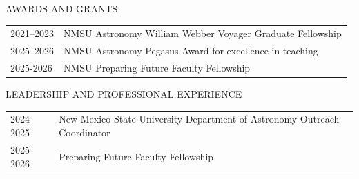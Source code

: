 
\begin{center}
AWARDS AND GRANTS
\end{center}
 
\begin{flushleft}
\begin{tabular}{ll}

2021--2023 & NMSU Astronomy William Webber Voyager Graduate Fellowship \\
2025--2026 & NMSU Astronomy Pegasus Award for excellence in teaching \\
2025-2026 & NMSU Preparing Future Faculty Fellowship 
\end{tabular}
\end{flushleft}

\medskip

\doublespacing


\begin{center}
LEADERSHIP AND PROFESSIONAL EXPERIENCE
\end{center}
\begin{flushleft}
\begin{tabular}{ll}
2024-2025 & New Mexico State University Department of Astronomy Outreach Coordinator \\
2025-2026 & Preparing Future Faculty Fellowship 
\end{tabular}
\end{flushleft}
